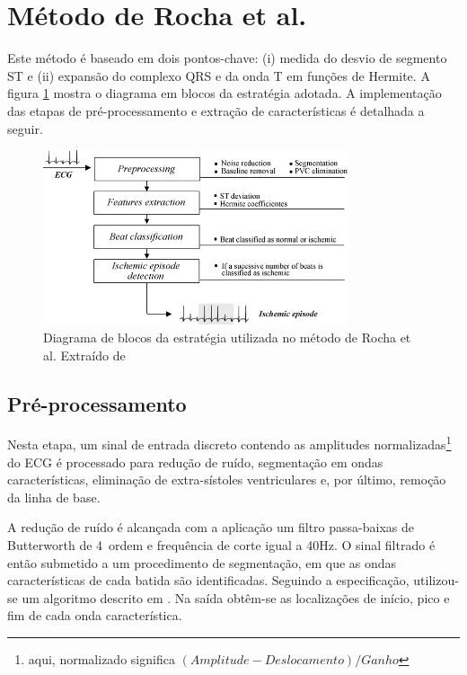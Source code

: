 
\section{Método de Rocha et al.}
\label{sec:section2}
Este método é baseado em dois pontos-chave: (i) medida do desvio de segmento ST e (ii) expansão do complexo QRS e da onda T em funções de Hermite. A figura \ref{fig:rocha_01} mostra o diagrama em blocos da estratégia adotada. A implementação das etapas de pré-processamento e extração de características é detalhada a seguir.

\begin{figure}[h]
    \centering
    \includegraphics[width=0.8\textwidth]{figures/rocha_01.png}
    \caption{Diagrama de blocos da estratégia utilizada no método de Rocha et al. Extraído de \cite{Rocha10}}
    \label{fig:rocha_01}
\end{figure}

\subsection{Pré-processamento}
Nesta etapa, um sinal de entrada discreto contendo as amplitudes normalizadas\footnote{aqui, normalizado significa $(Amplitude - Deslocamento) / Ganho$} do ECG é processado para redução de ruído, segmentação em ondas características, eliminação de extra-sístoles ventriculares e, por último, remoção da linha de base.

A redução de ruído é alcançada com a aplicação um filtro passa-baixas de Butterworth de 4\textordfeminine\ ordem e frequência de corte igual a 40Hz. O sinal filtrado é então submetido a um procedimento de segmentação, em que as ondas características de cada batida são identificadas. Seguindo a especificação, utilizou-se um algoritmo descrito em \cite{Sun05}. Na saída obtêm-se as localizações de início, pico e fim de cada onda característica.

